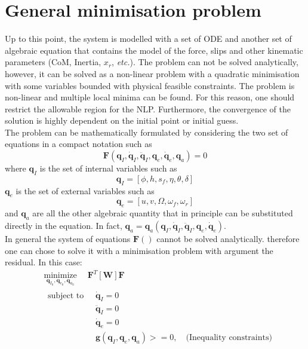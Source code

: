 \section{General minimisation problem}
%
Up to this point, the system is modelled with a set of ODE and another set of algebraic equation that contains the model of the force, slips and other kinematic parameters (CoM, Inertia, $x_r$,  \textit{etc.}). The problem can not be solved analytically, however, it can be solved as a non-linear problem with a quadratic minimisation with some variables bounded with physical feasible constraints. The problem is non-linear and multiple local minima can be found. For this reason, one should restrict the allowable region for the NLP. Furthermore, the convergence of the solution is highly dependent on the initial point or initial guess.\\
The problem can be mathematically formulated by considering the two set of equations in a compact notation such as
%
\begin{equation}
    \mathbf{F}(\mathbf{q}_I,\dot{\mathbf{q}}_I,\ddot{\mathbf{q}}_I,\mathbf{q}_e,\dot{\mathbf{q}}_e,\mathbf{q}_a)=0
\end{equation}
%
where $\mathbf{q}_I$ is the set of internal variables such as 
%
\begin{equation}
    \mathbf{q}_I = [\phi,h,s_f,\eta,\theta,\delta ] 
\end{equation}
%
$\mathbf{q}_e$ is the set of external variables such as 
%
\begin{equation}
    \mathbf{q}_e = [u,v,\Omega,\omega_f,\omega_r ] 
\end{equation}
%
and $\mathbf{q}_a$ are all the other algebraic quantity that in principle can be substituted directly in the equation. In fact, $\mathbf{q}_a=\mathbf{q}_a(\mathbf{q}_I,\dot{\mathbf{q}}_I,\ddot{\mathbf{q}}_I,\mathbf{q}_e,\dot{\mathbf{q}}_e)$.\\
%
In general the system of equations $\mathbf{F}()$ cannot be solved analytically. therefore one can chose to solve it with a minimisation problem with argument the residual. In this case:
%
\begin{equation}
    \begin{aligned}
    &\underset{\mathbf{q}_{I_0}, \mathbf{q}_{e_0}, \mathbf{q}_{a_0}}{\operatorname{minimize}} \quad \mathbf{F}^T [\mathbf{W}]  \mathbf{F} \\
    &\begin{aligned}
        {\text { subject to }} \;
        & \dot{\mathbf{q}}_I=0\\
        & \ddot{\mathbf{q}}_I=0\\
        & \dot{\mathbf{q}}_e=0\\
        & \mathbf{g}(\mathbf{q}_I, \mathbf{q}_e, \mathbf{q}_a)>=0, \quad \text{(Inequality constraints)}
    \end{aligned}\\
    \end{aligned}
\end{equation}
